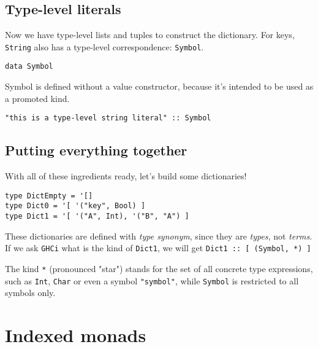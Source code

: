 \documentclass[pldi]{sigplanconf-pldi16}
\begin{document}
\subsection{Type-level literals}

Now we have type-level lists and tuples to construct the dictionary.
For keys, \texttt{String} also has a type-level correspondence:
\texttt{Symbol}.

\begin{verbatim}
data Symbol
\end{verbatim}

Symbol is defined without a value constructor, because it's intended to be used
 as a promoted kind.

\begin{verbatim}
"this is a type-level string literal" :: Symbol
\end{verbatim}
%

\subsection{Putting everything together}

With all of these ingredients ready, let's build some dictionaries!

\begin{verbatim}
type DictEmpty = '[]
type Dict0 = '[ '("key", Bool) ]
type Dict1 = '[ '("A", Int), '("B", "A") ]
\end{verbatim}

These dictionaries are defined with \emph{type synonym}, since they are
 \emph{types}, not \emph{terms}. If we ask \texttt{GHCi} what is the
 kind of \texttt{Dict1}, we will get
 \texttt{Dict1 :: [ (Symbol, *) ]}

The kind \texttt{*} (pronounced "star") stands for the set of all
 concrete type expressions, such as \texttt{Int},
 \texttt{Char} or even a symbol \texttt{"symbol"},
 while \texttt{Symbol} is restricted to all symbols only.

\section{Indexed monads}
\end{document}
